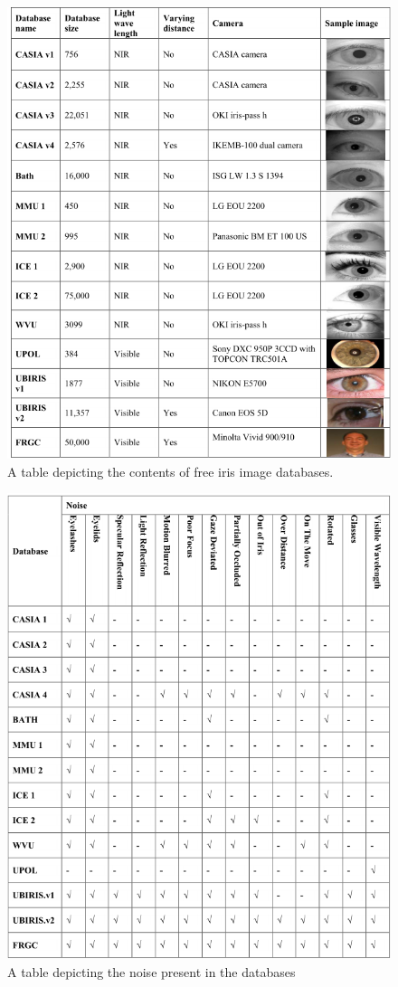 \begin{figure}
\centering
\includegraphics[width=\textwidth]{figures/Iris_Database_tabel_1.png} 
\caption{A table depicting the contents of free iris image databases.}
\label{fig:Iris_database_1}
\end{figure}

\begin{figure}
\centering
\includegraphics[width=\textwidth]{figures/Iris_Database_tabel_2.png} 
\caption{A table depicting the noise present in the databases}
\label{fig:Iris_database_2}
\end{figure}

